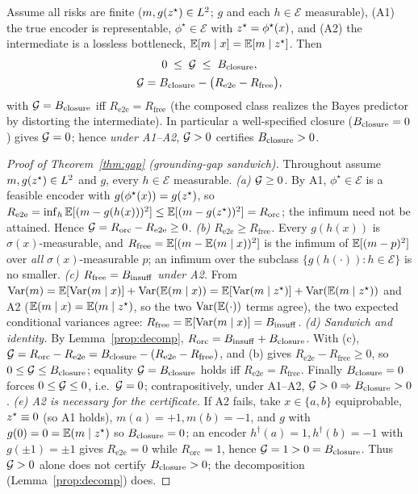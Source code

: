 \begin{theorem}\label{thm:gap}
Assume all risks are finite ($m,g(z^\star)\in L^2$; $g$ and each $h\in\mathcal E$
measurable), (A1) the true encoder is representable, $\phi^\star\in\mathcal E$ with
$z^\star=\phi^\star(x)$, and (A2) the intermediate is a lossless bottleneck,
$\mathbb{E}[m\mid x]=\mathbb{E}[m\mid z^\star]$. Then
\begin{equation}
\begin{gathered}
0\;\le\;\mathcal{G}\;\le\;B_{\mathrm{closure}},\\
\mathcal{G}=B_{\mathrm{closure}}-\big(R_{\mathrm{e2e}}-R_{\mathrm{free}}\big),
\end{gathered}
\label{eq:gap}
\end{equation}
with $\mathcal{G}=B_{\mathrm{closure}}$ iff $R_{\mathrm{e2e}}=R_{\mathrm{free}}$ (the composed class realizes
the Bayes predictor by distorting the intermediate). In particular a well-specified closure
($B_{\mathrm{closure}}=0$) gives $\mathcal{G}=0$; hence \emph{under A1--A2}, $\mathcal{G}>0$ certifies $B_{\mathrm{closure}}>0$.
\end{theorem}
\begin{proof}[Proof of Theorem~\ref{thm:gap} (grounding-gap sandwich)]
Throughout assume $m,g(z^\star)\in L^2$ and $g$, every $h\in\mathcal E$ measurable.
\emph{(a) $\mathcal{G}\ge0$.} By A1, $\phi^\star\in\mathcal E$ is a feasible encoder with
$g(\phi^\star(x))=g(z^\star)$, so $R_{\mathrm{e2e}}=\inf_{h}\mathbb{E}[(m-g(h(x)))^2]\le
\mathbb{E}[(m-g(z^\star))^2]=R_{\mathrm{orc}}$; the infimum need not be attained. Hence
$\mathcal{G}=R_{\mathrm{orc}}-R_{\mathrm{e2e}}\ge0$.
\emph{(b) $R_{\mathrm{e2e}}\ge R_{\mathrm{free}}$.} Every $g(h(x))$ is
$\sigma(x)$-measurable, and $R_{\mathrm{free}}=\mathbb{E}[(m-\mathbb{E}(m\mid x))^2]$ is the infimum of
$\mathbb{E}[(m-p)^2]$ over \emph{all} $\sigma(x)$-measurable $p$; an infimum over the subclass
$\{g(h(\cdot)):h\in\mathcal E\}$ is no smaller.
\emph{(c) $R_{\mathrm{free}}=B_{\mathrm{insuff}}$ under A2.} From
$\mathrm{Var}(m)=\mathbb{E}[\mathrm{Var}(m\mid x)]+\mathrm{Var}(\mathbb{E}(m\mid x))=\mathbb{E}[\mathrm{Var}(m\mid z^\star)]+\mathrm{Var}(\mathbb{E}(m\mid z^\star))$
and A2 ($\mathbb{E}(m\mid x)=\mathbb{E}(m\mid z^\star)$, so the two $\mathrm{Var}(\mathbb{E}(\cdot))$ terms agree), the two
expected conditional variances agree: $R_{\mathrm{free}}=\mathbb{E}[\mathrm{Var}(m\mid x)]=B_{\mathrm{insuff}}$.
\emph{(d) Sandwich and identity.} By Lemma~\ref{prop:decomp},
$R_{\mathrm{orc}}=B_{\mathrm{insuff}}+B_{\mathrm{closure}}$. With (c),
$\mathcal{G}=R_{\mathrm{orc}}-R_{\mathrm{e2e}}=B_{\mathrm{closure}}-(R_{\mathrm{e2e}}-R_{\mathrm{free}})$, and (b)
gives $R_{\mathrm{e2e}}-R_{\mathrm{free}}\ge0$, so $0\le\mathcal{G}\le B_{\mathrm{closure}}$; equality
$\mathcal{G}=B_{\mathrm{closure}}$ holds iff $R_{\mathrm{e2e}}=R_{\mathrm{free}}$. Finally $B_{\mathrm{closure}}=0$ forces
$0\le\mathcal{G}\le0$, i.e.\ $\mathcal{G}=0$; contrapositively, under A1--A2, $\mathcal{G}>0\Rightarrow B_{\mathrm{closure}}>0$.
\emph{(e) A2 is necessary for the certificate.} If A2 fails, take $x\in\{a,b\}$ equiprobable,
$z^\star\equiv0$ (so A1 holds), $m(a)=+1,m(b)=-1$, and $g$ with $g(0)=0=\mathbb{E}(m\mid z^\star)$ so
$B_{\mathrm{closure}}=0$; an encoder $h^\dagger(a)=1,h^\dagger(b)=-1$ with $g(\pm1)=\pm1$ gives
$R_{\mathrm{e2e}}=0$ while $R_{\mathrm{orc}}=1$, hence $\mathcal{G}=1>0=B_{\mathrm{closure}}$. Thus $\mathcal{G}>0$ alone
does not certify $B_{\mathrm{closure}}>0$; the decomposition (Lemma~\ref{prop:decomp}) does.
\end{proof}

